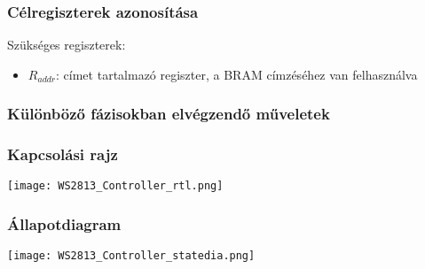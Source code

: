 \subsubsection{Célregiszterek azonosítása}

\tab Szükséges regiszterek:
\begin{itemize}
	\item $R_{addr}$: címet tartalmazó regiszter, a BRAM címzéséhez van felhasználva
\end{itemize}


\subsubsection{Különböző fázisokban elvégzendő műveletek}




\subsubsection{Kapcsolási rajz}

\texttt{[image: WS2813\_Controller\_rtl.png]}

\subsubsection{Állapotdiagram}

\texttt{[image: WS2813\_Controller\_statedia.png]}